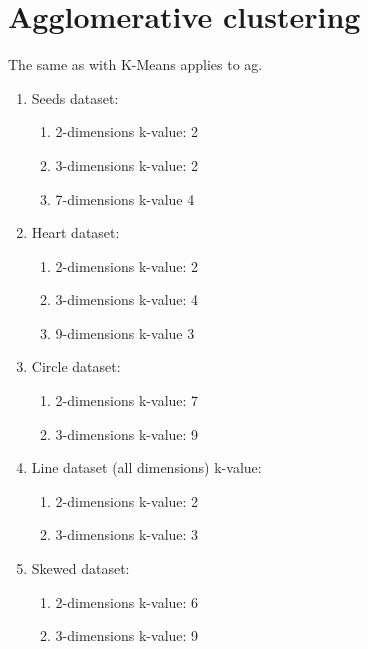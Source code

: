 \section{Agglomerative clustering} \label{appendix:agglomerative-hyperparameters}
The same as with K-Means applies to \gls{ag}.
\begin{enumerate}
    \item Seeds dataset:
    \begin{enumerate}
        \item 2-dimensions k-value: 2
        \item 3-dimensions k-value: 2
        \item 7-dimensions k-value 4
    \end{enumerate}
    \item     Heart dataset:
    \begin{enumerate}
        \item 2-dimensions k-value: 2
        \item 3-dimensions k-value: 4
        \item 9-dimensions k-value 3
    \end{enumerate}
    \item Circle dataset:
    \begin{enumerate}
        \item 2-dimensions k-value: 7
        \item 3-dimensions k-value: 9
    \end{enumerate}
    \item Line dataset (all dimensions) k-value: 
    \begin{enumerate}
        \item 2-dimensions k-value: 2
        \item 3-dimensions k-value: 3
    \end{enumerate}
    \item Skewed dataset:
    \begin{enumerate}
        \item 2-dimensions k-value: 6
        \item 3-dimensions k-value: 9
    \end{enumerate}
\end{enumerate}
\newpage
